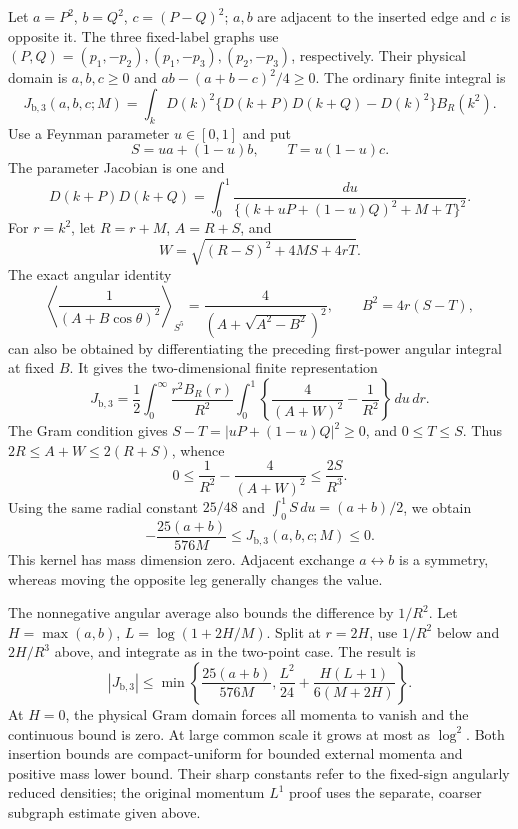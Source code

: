 Let $a=P^2$, $b=Q^2$, $c=(P-Q)^2$; $a,b$ are adjacent to the inserted
edge and $c$ is opposite it. The three fixed-label graphs use
$(P,Q)=(p_1,-p_2),(p_1,-p_3),(p_2,-p_3)$, respectively. Their physical
domain is $a,b,c\ge0$ and $ab-(a+b-c)^2/4\ge0$.
The ordinary finite integral is
\[
 J_{\mathrm{b},3}(a,b,c;M)
 =\int_k D(k)^2\{D(k+P)D(k+Q)-D(k)^2\}B_R(k^2).
\]
Use a Feynman parameter $u\in[0,1]$ and put
\[
 S=ua+(1-u)b,\qquad T=u(1-u)c.
\]
The parameter Jacobian is one and
\[
 D(k+P)D(k+Q)
 =\int_0^1\frac{du}{\{(k+uP+(1-u)Q)^2+M+T\}^2}.
\]
For $r=k^2$, let $R=r+M$, $A=R+S$, and
\[
 W=\sqrt{(R-S)^2+4MS+4rT}.
\]
The exact angular identity
\[
 \left\langle\frac1{(A+B\cos\theta)^2}\right\rangle_{S^5}
   =\frac4{(A+\sqrt{A^2-B^2})^2},\qquad
 B^2=4r(S-T),
\]
can also be obtained by differentiating the preceding first-power angular
integral at fixed $B$. It gives the two-dimensional finite representation
\[
 J_{\mathrm{b},3}
 =\frac12\int_0^\infty\frac{r^2B_R(r)}{R^2}
       \int_0^1\left\{\frac4{(A+W)^2}-\frac1{R^2}\right\}\,du\,dr.
\]
The Gram condition gives $S-T=|uP+(1-u)Q|^2\ge0$, and $0\le T\le S$.
Thus $2R\le A+W\le2(R+S)$, whence
\[
 0\le\frac1{R^2}-\frac4{(A+W)^2}\le\frac{2S}{R^3}.
\]
Using the same radial constant $25/48$ and
$\int_0^1S\,du=(a+b)/2$, we obtain
\[
 -\frac{25(a+b)}{576M}\le J_{\mathrm{b},3}(a,b,c;M)\le0.
\]
This kernel has mass dimension zero. Adjacent exchange $a\leftrightarrow b$
is a symmetry, whereas moving the opposite leg generally changes the value.

The nonnegative angular average also bounds the difference by $1/R^2$.
Let $H=\max(a,b)$, $L=\log(1+2H/M)$. Split at $r=2H$, use $1/R^2$
below and $2H/R^3$ above, and integrate as in the two-point case. The
result is
\[
 |J_{\mathrm{b},3}|\le
 \min\left\{\frac{25(a+b)}{576M},
        \frac{L^2}{24}+\frac{H(L+1)}{6(M+2H)}\right\}.
\]
At $H=0$, the physical Gram domain forces all momenta to vanish and the
continuous bound is zero. At large common scale it grows at most as
$\log^2$. Both insertion bounds are compact-uniform for bounded external
momenta and positive mass lower bound. Their sharp constants refer to the
fixed-sign angularly reduced densities; the original momentum $L^1$ proof
uses the separate, coarser subgraph estimate given above.
